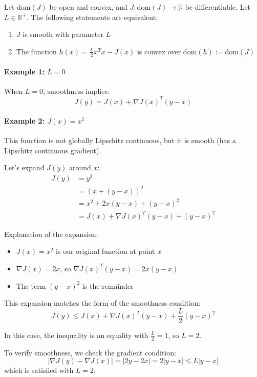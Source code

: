 \begin{lemma}
Let $\text{dom}(J)$ be open and convex, and $J: \text{dom}(J) \to \mathbb{R}$ be differentiable.
Let $L \in \mathbb{R}^+$. The following statements are equivalent:
\begin{enumerate}
    \item $J$ is smooth with parameter $L$
    \item The function $h(x) = \frac{L}{2}x^Tx - J(x)$ is convex over $\text{dom}(h) := \text{dom}(J)$
\end{enumerate}
\end{lemma}


\paragraph{Example 1: $L = 0$}
When $L = 0$, smoothness implies:
\[
J(y) = J(x) + \nabla J(x)^T(y-x)
\]

\paragraph{Example 2: $J(x) = x^2$}
This function is not globally Lipschitz continuous, but it is smooth (has a Lipschitz continuous gradient).

Let's expand $J(y)$ around $x$:
\begin{align*}
J(y) &= y^2 \\
&= (x + (y-x))^2 \\
&= x^2 + 2x(y-x) + (y-x)^2 \\
&= J(x) + \nabla J(x)^T(y-x) + (y-x)^2
\end{align*}

Explanation of the expansion:
\begin{itemize}
    \item $J(x) = x^2$ is our original function at point $x$
    \item $\nabla J(x) = 2x$, so $\nabla J(x)^T(y-x) = 2x(y-x)$
    \item The term $(y-x)^2$ is the remainder
\end{itemize}

This expansion matches the form of the smoothness condition:
\[
J(y) \leq J(x) + \nabla J(x)^T(y-x) + \frac{L}{2}(y-x)^2
\]

In this case, the inequality is an equality with $\frac{L}{2} = 1$, so $L = 2$.

To verify smoothness, we check the gradient condition:
\[
|\nabla J(y) - \nabla J(x)| = |2y - 2x| = 2|y-x| \leq L|y-x|
\]
which is satisfied with $L = 2$.


